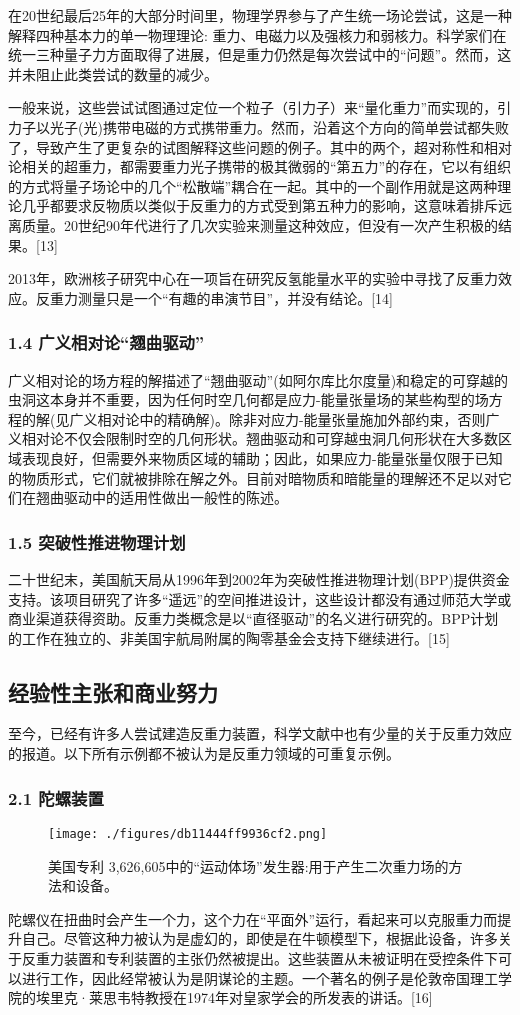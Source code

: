在20世纪最后25年的大部分时间里，物理学界参与了产生统一场论尝试，这是一种解释四种基本力的单一物理理论: 重力、电磁力以及强核力和弱核力。科学家们在统一三种量子力方面取得了进展，但是重力仍然是每次尝试中的“问题”。然而，这并未阻止此类尝试的数量的减少。

一般来说，这些尝试试图通过定位一个粒子（引力子）来“量化重力”而实现的，引力子以光子(光)携带电磁的方式携带重力。然而，沿着这个方向的简单尝试都失败了，导致产生了更复杂的试图解释这些问题的例子。其中的两个，超对称性和相对论相关的超重力，都需要重力光子携带的极其微弱的“第五力”的存在，它以有组织的方式将量子场论中的几个“松散端”耦合在一起。其中的一个副作用就是这两种理论几乎都要求反物质以类似于反重力的方式受到第五种力的影响，这意味着排斥远离质量。20世纪90年代进行了几次实验来测量这种效应，但没有一次产生积极的结果。[13]

2013年，欧洲核子研究中心在一项旨在研究反氢能量水平的实验中寻找了反重力效应。反重力测量只是一个“有趣的串演节目”，并没有结论。[14]
\subsubsection{1.4 广义相对论“翘曲驱动”}
广义相对论的场方程的解描述了“翘曲驱动”(如阿尔库比尔度量)和稳定的可穿越的虫洞这本身并不重要，因为任何时空几何都是应力-能量张量场的某些构型的场方程的解(见广义相对论中的精确解)。除非对应力-能量张量施加外部约束，否则广义相对论不仅会限制时空的几何形状。翘曲驱动和可穿越虫洞几何形状在大多数区域表现良好，但需要外来物质区域的辅助；因此，如果应力-能量张量仅限于已知的物质形式，它们就被排除在解之外。目前对暗物质和暗能量的理解还不足以对它们在翘曲驱动中的适用性做出一般性的陈述。
\subsubsection{1.5 突破性推进物理计划}
二十世纪末，美国航天局从1996年到2002年为突破性推进物理计划(BPP)提供资金支持。该项目研究了许多“遥远”的空间推进设计，这些设计都没有通过师范大学或商业渠道获得资助。反重力类概念是以“直径驱动”的名义进行研究的。BPP计划的工作在独立的、非美国宇航局附属的陶零基金会支持下继续进行。[15]
\subsection{经验性主张和商业努力}
至今，已经有许多人尝试建造反重力装置，科学文献中也有少量的关于反重力效应的报道。以下所有示例都不被认为是反重力领域的可重复示例。
\subsubsection{2.1 陀螺装置}
\begin{figure}[ht]
\centering
\texttt{[image: ./figures/db11444ff9936cf2.png]}
\caption{美国专利 3,626,605中的“运动体场”发生器:用于产生二次重力场的方法和设备。} \label{fig_FZL_3}
\end{figure}
陀螺仪在扭曲时会产生一个力，这个力在“平面外”运行，看起来可以克服重力而提升自己。尽管这种力被认为是虚幻的，即使是在牛顿模型下，根据此设备，许多关于反重力装置和专利装置的主张仍然被提出。这些装置从未被证明在受控条件下可以进行工作，因此经常被认为是阴谋论的主题。一个著名的例子是伦敦帝国理工学院的埃里克·莱思韦特教授在1974年对皇家学会的所发表的讲话。[16]

